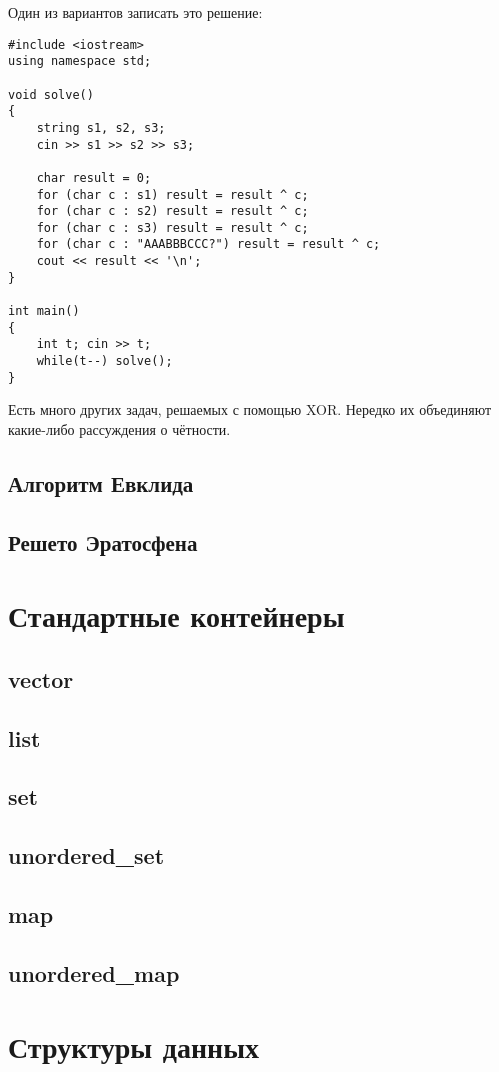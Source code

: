 \documentclass[a4paper,8pt]{article}
\begin{document}
    Один из вариантов записать это решение:
\begin{lstlisting}
#include <iostream>
using namespace std;

void solve()
{
    string s1, s2, s3;
    cin >> s1 >> s2 >> s3;
    
    char result = 0;
    for (char c : s1) result = result ^ c;
    for (char c : s2) result = result ^ c;
    for (char c : s3) result = result ^ c;
    for (char c : "AAABBBCCC?") result = result ^ c;
    cout << result << '\n';
}

int main()
{
    int t; cin >> t;
    while(t--) solve();
}
\end{lstlisting}

    Есть много других задач, решаемых с помощью XOR. Нередко их объединяют какие-либо рассуждения о чётности.
    \subsection{Алгоритм Евклида}
    \subsection{Решето Эратосфена}
\section{Стандартные контейнеры}
    \subsection{vector}
    \subsection{list}
    \subsection{set}
    \subsection{unordered\_set}
    \subsection{map}
    \subsection{unordered\_map}
\section{Структуры данных}
\end{document}

